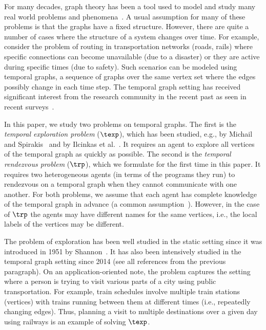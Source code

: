 
For many decades, graph theory has been a tool used to model and study many real
world problems and phenomena~\cite{BondyM76}. A usual assumption for many of
these problems is that the graphs have a fixed structure. However, there are
quite a number of cases where the structure of a system changes over time. For
example, consider the problem of routing in transportation networks (roads,
rails) where specific connections can become unavailable (due to a disaster) or
they are active during specific times (due to safety). Such scenarios can be
modeled using temporal graphs, a sequence of graphs over the same vertex set
where the edges possibly change in each time step. The temporal graph setting
has received significant interest from the research community in the recent past
as seen in recent surveys~\cite{CasteigtsFQS12,Michail16}. 

In this paper, we study two problems on temporal graphs. The first is the
\textit{temporal exploration problem} ($\texp$), which has been studied, e.g., by Michail and
Spirakis~\cite{MichailS14,MichailS16} and by Ilcinkas et
al.~\cite{IlcinkasKW14}. It requires an agent to explore all vertices of the
temporal graph as quickly as possible. The second is the \textit{temporal
rendezvous problem} ($\trp$), which we formulate for the first time in this
paper. It requires two heterogeneous agents (in terms of the programs they run)
to rendezvous on a temporal graph when they cannot communicate with one another.
For both problems, we assume that each  agent has complete knowledge of the
temporal graph in advance (a common
assumption~\cite{AdamsonGMZ22,BodlaenderV19,ErlebachHK21,ErlebachKLSS19,ErlebachS22a,ErlebachS22b,IlcinkasKW14,MichailS14,MichailS16,Taghian20}).
However, in the case of $\trp$ the agents may have different names for the same
vertices, i.e., the local labels of the vertices may be different. 

The problem of exploration has been well studied in the static setting since it was introduced in 1951 by Shannon~\cite{Shannon51}.  
It has also been intensively studied in the temporal graph setting since
2014 (see all references from the previous paragraph).
On an application-oriented note, the problem captures the setting where a person
is trying to visit various parts of a city using %
public
transportation. For example, train schedules involve multiple train
stations (vertices) with trains running between them at different times (i.e.,
repeatedly
changing edges). Thus, planning a visit to multiple destinations
over a given day using railways is an example of solving $\texp$.


